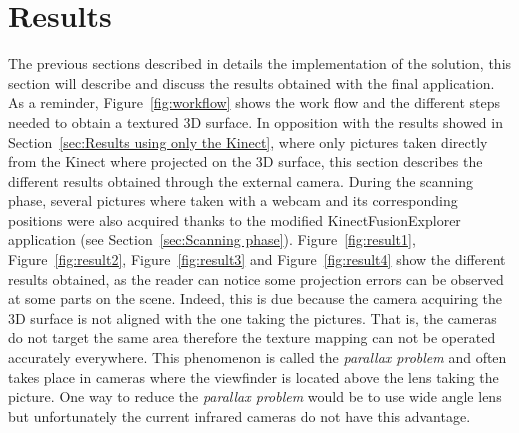 \section{Results}
\label{sec:Results}

The previous sections described in details the implementation of the solution, this section will describe and discuss the results obtained with the final application.\\

As a reminder, Figure~\ref{fig:workflow} shows the work flow and the different steps needed to obtain a textured 3D surface. In opposition with the results showed in Section~\ref{sec:Results using only the Kinect}, where only pictures taken directly from the Kinect where projected on the 3D surface, this section describes the different results obtained through the external camera. During the scanning phase, several pictures where taken with a webcam and its corresponding positions were also acquired thanks to the modified KinectFusionExplorer application (see Section~\ref{sec:Scanning phase}). Figure~\ref{fig:result1}, Figure~\ref{fig:result2}, Figure~\ref{fig:result3} and Figure~\ref{fig:result4} show the different results obtained, as the reader can notice some projection errors can be observed at some parts on the scene. Indeed, this is due because the camera acquiring the 3D surface is not aligned with the one taking the pictures. That is, the cameras do not target the same area therefore the texture mapping can not be operated accurately everywhere. This phenomenon is called the \textit{parallax problem} and often takes place in cameras where the viewfinder is located above the lens taking the picture. One way to reduce the \textit{parallax problem} would be to use wide angle lens but unfortunately the current infrared cameras do not have this advantage.

